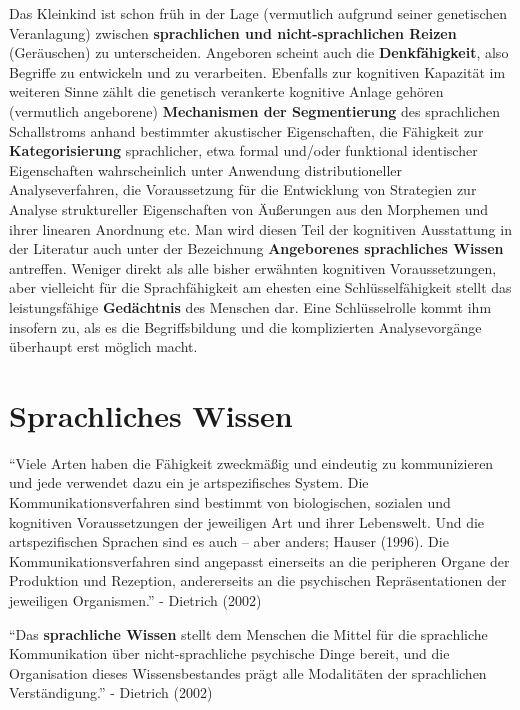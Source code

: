 \documentclass[
  letterpaper,
]{scrbook}
\begin{document}
\hfill\break
Das Kleinkind ist schon früh in der Lage (vermutlich aufgrund seiner
genetischen Veranlagung) zwischen \textbf{sprachlichen und
nicht-sprachlichen Reizen} (Geräuschen) zu unterscheiden. Angeboren
scheint auch die \textbf{Denkfähigkeit}, also Begriffe zu entwickeln und
zu verarbeiten. Ebenfalls zur kognitiven Kapazität im weiteren Sinne
zählt die genetisch verankerte kognitive Anlage gehören (vermutlich
angeborene) \textbf{Mechanismen der Segmentierung} des sprachlichen
Schallstroms anhand bestimmter akustischer Eigenschaften, die Fähigkeit
zur \textbf{Kategorisierung} sprachlicher, etwa formal und/oder
funktional identischer Eigenschaften wahrscheinlich unter Anwendung
distributioneller Analyseverfahren, die Voraussetzung für die
Entwicklung von Strategien zur Analyse struktureller Eigenschaften von
Äußerungen aus den Morphemen und ihrer linearen Anordnung etc. Man wird
diesen Teil der kognitiven Ausstattung in der Literatur auch unter der
Bezeichnung \textbf{Angeborenes sprachliches Wissen} antreffen. Weniger
direkt als alle bisher erwähnten kognitiven Voraussetzungen, aber
vielleicht für die Sprachfähigkeit am ehesten eine Schlüsselfähigkeit
stellt das leistungsfähige \textbf{Gedächtnis} des Menschen dar. Eine
Schlüsselrolle kommt ihm insofern zu, als es die Begriffsbildung und die
komplizierten Analysevorgänge überhaupt erst möglich macht.\\

\hypertarget{sprachliches-wissen}{%
\section{Sprachliches Wissen}\label{sprachliches-wissen}}

``Viele Arten haben die Fähigkeit zweckmäßig und eindeutig zu
kommunizieren und jede verwendet dazu ein je artspezifisches System. Die
Kommunikationsverfahren sind bestimmt von biologischen, sozialen und
kognitiven Voraussetzungen der jeweiligen Art und ihrer Lebenswelt. Und
die artspezifischen Sprachen sind es auch -- aber anders; Hauser (1996).
Die Kommunikationsverfahren sind angepasst einerseits an die peripheren
Organe der Produktion und Rezeption, andererseits an die psychischen
Repräsentationen der jeweiligen Organismen.'' - Dietrich (2002)

``Das \textbf{sprachliche Wissen} stellt dem Menschen die Mittel für die
sprachliche Kommunikation über nicht-sprachliche psychische Dinge
bereit, und die Organisation dieses Wissensbestandes prägt alle
Modalitäten der sprachlichen Verständigung.'' - Dietrich (2002)
\end{document}
